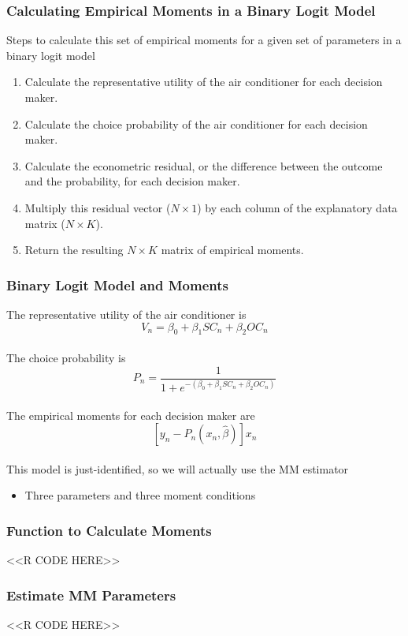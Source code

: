 \documentclass{beamer}
\begin{document}
\begin{frame}\frametitle{Calculating Empirical Moments in a Binary Logit Model}
    Steps to calculate this set of empirical moments for a given set of parameters in a binary logit model
    \begin{enumerate}
        \item Calculate the representative utility of the air conditioner for each decision maker.
        \item Calculate the choice probability of the air conditioner for each decision maker.
        \item Calculate the econometric residual, or the difference between the outcome and the probability, for each decision maker.
        \item Multiply this residual vector ($N \times 1$) by each column of the explanatory data matrix ($N \times K$).
        \item Return the resulting $N \times K$ matrix of empirical moments.
    \end{enumerate}
\end{frame}

\begin{frame}\frametitle{Binary Logit Model and Moments}
    The representative utility of the air conditioner is
    $$V_n = \beta_0 + \beta_1 SC_n + \beta_2 OC_n$$ \\
    \vspace{2ex}
    The choice probability is
    $$P_n = \frac{1}{1 + e^{-(\beta_0 + \beta_1 SC_n + \beta_2 OC_n)}}$$ \\
    \vspace{2ex}
    The empirical moments for each decision maker are
    $$[y_n - P_n(x_n, \hat{\beta})] x_n$$ \\
    \vspace{2ex}
    This model is just-identified, so we will actually use the MM estimator
    \begin{itemize}
        \item Three parameters and three moment conditions
    \end{itemize}
\end{frame}

\begin{frame}[fragile]\frametitle{Function to Calculate Moments}
    <<R CODE HERE>>
\end{frame}

\begin{frame}[fragile]\frametitle{Estimate MM Parameters}
    <<R CODE HERE>>
\end{frame}
\end{document}
